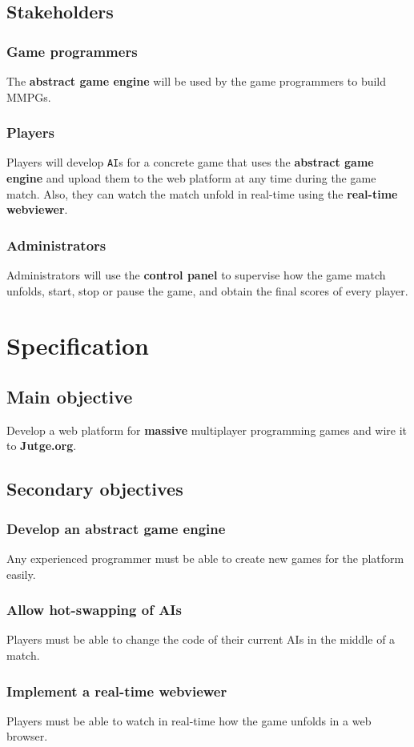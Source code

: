 \documentclass[a4paper,11pt,titlepage,abstract,numbers=noenddot,automark,mnsy,intlimits,rgb,dvipsnames]{report}
\begin{document}
\section{Stakeholders}
\subsection{Game programmers}
The \textbf{abstract game engine} will be used by the game programmers to build MMPGs.
\subsection{Players}
Players will develop \texttt{AI}s for a concrete game that uses the \textbf{abstract game engine}
and upload them to the web platform at any time during the game match. Also, they can watch the match unfold
in real-time using the \textbf{real-time webviewer}.
\subsection{Administrators}
Administrators will use the \textbf{control panel} to supervise how the game match unfolds, start, stop or pause the game, and obtain
the final scores of every player.
\clearpage
\chapter{Specification}
\section{Main objective}
Develop a web platform for \textbf{massive} multiplayer programming games and wire it to \textbf{Jutge.org}.
\section{Secondary objectives}
\subsection{Develop an abstract game engine}
Any experienced programmer must be able to create new games for the platform easily.
\subsection{Allow hot-swapping of AIs}
Players must be able to change the code of their current AIs in the middle of a match.
\subsection{Implement a real-time webviewer}
Players must be able to watch in real-time how the game unfolds in a web browser.
\end{document}
